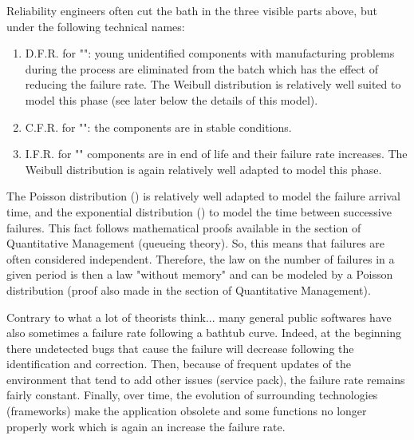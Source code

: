 	Reliability engineers often cut the bath in the three visible parts above, but under the following technical names:
	\begin{enumerate}
		\item D.F.R. for "": young unidentified components with manufacturing problems during the process are eliminated from the batch which has the effect of reducing the failure rate. The Weibull distribution is relatively well suited to model this phase (see later below the details of this model).
		
		\item C.F.R. for "": the components are in stable conditions.
		
		\item I.F.R. for "" components are in end of life and their failure rate increases. The Weibull distribution is again relatively well adapted to model this phase.
	\end{enumerate}
	\pageref{queueing theory}
	The Poisson distribution () is relatively well adapted to model the failure arrival time, and the exponential distribution () to model the time between successive failures. This fact follows mathematical proofs available in the section of Quantitative Management (queueing theory). So, this means that failures are often considered independent. Therefore, the law on the number of failures in a given period is then a law "without memory" and can be modeled by a Poisson distribution (proof also made in the section of Quantitative Management).
	
	\begin{tcolorbox}[title=Remark,colframe=black,arc=10pt]
	Contrary to what a lot of theorists think... many general public softwares have also sometimes a failure rate following a bathtub curve. Indeed, at the beginning there undetected bugs that cause the failure will decrease following the identification and correction. Then, because of frequent updates of the environment that tend to add other issues (service pack), the failure rate remains fairly constant. Finally, over time, the evolution of surrounding technologies (frameworks) make the application obsolete and some functions no longer properly work which is again an increase the failure rate.
	\end{tcolorbox}
	
